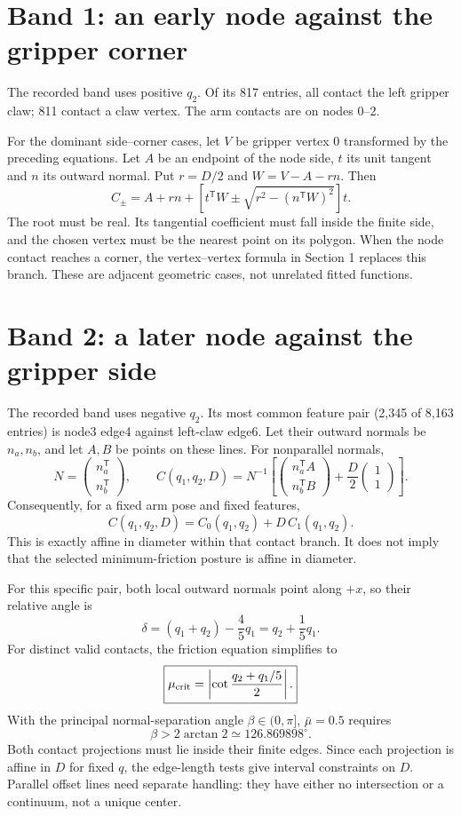 \documentclass{article}
\begin{document}
\section{Band 1: an early node against the gripper corner}
The recorded band uses positive $q_2$. Of its 817 entries, all contact the left gripper claw; 811 contact a claw vertex. The arm contacts are on nodes 0--2.

For the dominant side--corner cases, let $V$ be gripper vertex 0 transformed by the preceding equations. Let $A$ be an endpoint of the node side, $t$ its unit tangent and $n$ its outward normal. Put $r=D/2$ and $W=V-A-rn$. Then
\[
\boxed{C_\pm=A+rn+
\left[t^\mathsf TW\pm\sqrt{r^2-(n^\mathsf TW)^2}\right]t.}
\]
The root must be real. Its tangential coefficient must fall inside the finite side, and the chosen vertex must be the nearest point on its polygon. When the node contact reaches a corner, the vertex--vertex formula in Section 1 replaces this branch. These are adjacent geometric cases, not unrelated fitted functions.

\section{Band 2: a later node against the gripper side}
The recorded band uses negative $q_2$. Its most common feature pair (2,345 of 8,163 entries) is node3 edge4 against left-claw edge6. Let their outward normals be $n_a,n_b$, and let $A,B$ be points on these lines. For nonparallel normals,
\[
N=\begin{pmatrix}n_a^\mathsf T\\n_b^\mathsf T\end{pmatrix},
\qquad
\boxed{C(q_1,q_2,D)=N^{-1}
\left[\begin{pmatrix}n_a^\mathsf TA\\n_b^\mathsf TB\end{pmatrix}
+\frac D2\begin{pmatrix}1\\1\end{pmatrix}\right].}
\]
Consequently, for a fixed arm pose and fixed features,
\[
\boxed{C(q_1,q_2,D)=C_0(q_1,q_2)+D\,C_1(q_1,q_2).}
\]
This is exactly affine in diameter within that contact branch. It does not imply that the selected minimum-friction posture is affine in diameter.

For this specific pair, both local outward normals point along $+x$, so their relative angle is
\[
\delta=(q_1+q_2)-\frac45q_1=q_2+\frac15q_1.
\]
For distinct valid contacts, the friction equation simplifies to
\[
\boxed{\mu_{\rm crit}=\left|\cot\frac{q_2+q_1/5}{2}\right|.}
\]
With the principal normal-separation angle $\beta\in(0,\pi]$, $\bar\mu=0.5$ requires
\[
\beta>2\arctan 2\simeq126.869898^\circ.
\]
Both contact projections must lie inside their finite edges. Since each projection is affine in $D$ for fixed $q$, the edge-length tests give interval constraints on $D$. Parallel offset lines need separate handling: they have either no intersection or a continuum, not a unique center.
\end{document}
